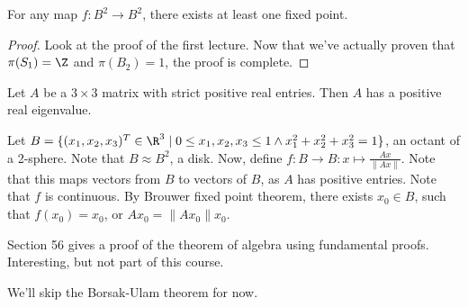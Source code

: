 \begin{theorem}
    For any map $f: B^2 \to B^2$, there exists at least one fixed point.
\end{theorem}
\begin{proof}
    Look at the proof of the first lecture. Now that we've actually proven that $\pi(S_1) = \Z$ and $\pi(B_2) = 1$, the proof is complete.
\end{proof}

\begin{eg}
    Let $A$ be a $3\times 3$ matrix with strict positive real entries.
    Then $A$ has a positive real eigenvalue.
\end{eg}
\begin{explanation}
    Let $B = \{(x_1, x_2, x_3)^{T} \in \R^3  \mid 0 \le  x_1, x_2, x_3 \le  1 \land x_1^2 + x_2^2 + x_3^2 = 1\} $, an octant of a 2-sphere.
    Note that $B \approx B^2$, a disk.
    Now, define $f: B \to B: x \mapsto  \frac{Ax}{\|Ax\|}$.
    Note that this maps vectors from $B$ to vectors of $B$, as $A$ has positive entries.
    Note that $f$ is continuous.
    By Brouwer fixed point theorem, there exists $x_0\in B$, such that $f(x_{0}) = x_0$, or 
    $Ax_0 = \|Ax_0\| x_0$.
\end{explanation}

\begin{remark}
    Section 56 gives a proof of the theorem of algebra using fundamental proofs.
    Interesting, but not part of this course.
\end{remark}
\begin{remark}
    We'll skip the Borsak-Ulam theorem for now.
\end{remark}

\setcounter{section}{57}
\setcounter{chapter}{9}
